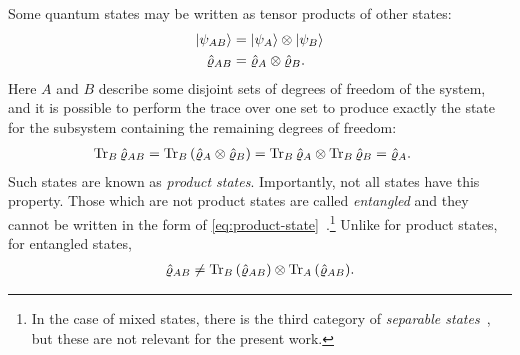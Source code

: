 Some quantum states may be written as tensor products of other states:
\begin{subequations} \label{eq:product-state}
\begin{align}
	\ket{\psi_{AB}}
	&= \ket{\psi_A} \otimes \ket{\psi_B} \\
	\hat{\varrho}_{AB}
	&= \hat{\varrho}_A \otimes \hat{\varrho}_B.
\end{align}
\end{subequations}
Here $A$ and $B$ describe some disjoint sets of degrees of freedom of the system, and it is possible to perform the trace over one set to produce exactly the state for the subsystem containing the remaining degrees of freedom:
\begin{align}
	\operatorname{Tr}_B{\hat{\varrho}_{AB}}
	&= \operatorname{Tr}_B{(\hat{\varrho}_A \otimes \hat{\varrho}_B)}
	= \operatorname{Tr}_B{\hat{\varrho}_A} \otimes \operatorname{Tr}_B{\hat{\varrho}_B}
	= \hat{\varrho}_A.
\end{align}
Such states are known as \emph{product states}.
Importantly, not all states have this property.
Those which are not product states are called \emph{entangled} and they cannot be written in the form of \cref{eq:product-state}~\cite[83]{wilde2013quantum}.\footnote{
	In the case of mixed states, there is the third category of \emph{separable states}~\cite[114]{wilde2013quantum}, but these are not relevant for the present work.
}
Unlike for product states, for entangled states,
\begin{align}
	\hat{\varrho}_{AB}
	\ne \operatorname{Tr}_B{(\hat{\varrho}_{AB})} \otimes \operatorname{Tr}_A{(\hat{\varrho}_{AB})}.
\end{align}

